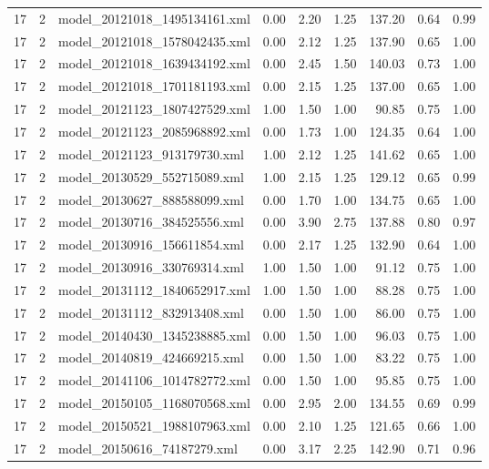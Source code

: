 \begin{table}[ht]
\begin{tabular}{rrlrrrrrr}
   17 &   2 & model\_20121018\_1495134161.xml & 0.00 & 2.20 & 1.25 & 137.20 & 0.64 & 0.99 \\ 
   17 &   2 & model\_20121018\_1578042435.xml & 0.00 & 2.12 & 1.25 & 137.90 & 0.65 & 1.00 \\ 
   17 &   2 & model\_20121018\_1639434192.xml & 0.00 & 2.45 & 1.50 & 140.03 & 0.73 & 1.00 \\ 
   17 &   2 & model\_20121018\_1701181193.xml & 0.00 & 2.15 & 1.25 & 137.00 & 0.65 & 1.00 \\ 
   17 &   2 & model\_20121123\_1807427529.xml & 1.00 & 1.50 & 1.00 & 90.85 & 0.75 & 1.00 \\ 
   17 &   2 & model\_20121123\_2085968892.xml & 0.00 & 1.73 & 1.00 & 124.35 & 0.64 & 1.00 \\ 
   17 &   2 & model\_20121123\_913179730.xml & 1.00 & 2.12 & 1.25 & 141.62 & 0.65 & 1.00 \\ 
   17 &   2 & model\_20130529\_552715089.xml & 1.00 & 2.15 & 1.25 & 129.12 & 0.65 & 0.99 \\ 
   17 &   2 & model\_20130627\_888588099.xml & 0.00 & 1.70 & 1.00 & 134.75 & 0.65 & 1.00 \\ 
   17 &   2 & model\_20130716\_384525556.xml & 0.00 & 3.90 & 2.75 & 137.88 & 0.80 & 0.97 \\ 
   17 &   2 & model\_20130916\_156611854.xml & 0.00 & 2.17 & 1.25 & 132.90 & 0.64 & 1.00 \\ 
   17 &   2 & model\_20130916\_330769314.xml & 1.00 & 1.50 & 1.00 & 91.12 & 0.75 & 1.00 \\ 
   17 &   2 & model\_20131112\_1840652917.xml & 1.00 & 1.50 & 1.00 & 88.28 & 0.75 & 1.00 \\ 
   17 &   2 & model\_20131112\_832913408.xml & 0.00 & 1.50 & 1.00 & 86.00 & 0.75 & 1.00 \\ 
   17 &   2 & model\_20140430\_1345238885.xml & 0.00 & 1.50 & 1.00 & 96.03 & 0.75 & 1.00 \\ 
   17 &   2 & model\_20140819\_424669215.xml & 0.00 & 1.50 & 1.00 & 83.22 & 0.75 & 1.00 \\ 
   17 &   2 & model\_20141106\_1014782772.xml & 0.00 & 1.50 & 1.00 & 95.85 & 0.75 & 1.00 \\ 
   17 &   2 & model\_20150105\_1168070568.xml & 0.00 & 2.95 & 2.00 & 134.55 & 0.69 & 0.99 \\ 
   17 &   2 & model\_20150521\_1988107963.xml & 0.00 & 2.10 & 1.25 & 121.65 & 0.66 & 1.00 \\ 
   17 &   2 & model\_20150616\_74187279.xml & 0.00 & 3.17 & 2.25 & 142.90 & 0.71 & 0.96 \\ 

\end{tabular}
\end{table}
